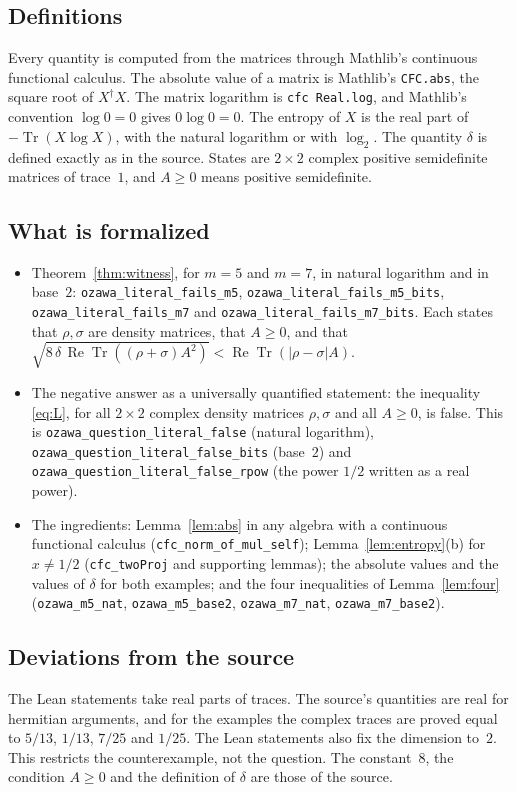 \documentclass[11pt]{amsart}
\theoremstyle{definition}\newtheorem{definition}[theorem]{Definition}
\theoremstyle{remark}\newtheorem{remark}[theorem]{Remark}
\DeclareMathOperator{\Tr}{Tr}
\DeclareMathOperator{\re}{Re}
\newcommand{\abs}[1]{\lvert #1\rvert}
\begin{document}
\subsection{Definitions}
Every quantity is computed from the matrices through Mathlib's continuous functional calculus. The absolute value of a matrix is Mathlib's \texttt{CFC.abs}, the square root of \(X^\dagger X\). The matrix logarithm is \texttt{cfc Real.log}, and Mathlib's convention \(\log0=0\) gives \(0\log0=0\). The entropy of \(X\) is the real part of \(-\Tr(X\log X)\), with the natural logarithm or with \(\log_2\). The quantity \(\delta\) is defined exactly as in the source. States are \(2\times2\) complex positive semidefinite matrices of trace~\(1\), and \(A\ge0\) means positive semidefinite.

\subsection{What is formalized}
\begin{itemize}
\item Theorem~\ref{thm:witness}, for \(m=5\) and \(m=7\), in natural logarithm and in base~\(2\): \texttt{ozawa\_literal\_fails\_m5}, \texttt{ozawa\_literal\_fails\_m5\_bits}, \texttt{ozawa\_literal\_fails\_m7} and \texttt{ozawa\_literal\_fails\_m7\_bits}. Each states that \(\rho,\sigma\) are density matrices, that \(A\ge0\), and that \(\sqrt{8\,\delta\,\re\Tr((\rho+\sigma)A^2)}<\re\Tr(\abs{\rho-\sigma}A)\).
\item The negative answer as a universally quantified statement: the inequality \eqref{eq:L}, for all \(2\times2\) complex density matrices \(\rho,\sigma\) and all \(A\ge0\), is false. This is \texttt{ozawa\_question\_literal\_false} (natural logarithm), \texttt{ozawa\_question\_literal\_false\_bits} (base~\(2\)) and \texttt{ozawa\_question\_literal\_false\_rpow} (the power \(1/2\) written as a real power).
\item The ingredients: Lemma~\ref{lem:abs} in any algebra with a continuous functional calculus (\texttt{cfc\_norm\_of\_mul\_self}); Lemma~\ref{lem:entropy}(b) for \(x\ne1/2\) (\texttt{cfc\_twoProj} and supporting lemmas); the absolute values and the values of \(\delta\) for both examples; and the four inequalities of Lemma~\ref{lem:four} (\texttt{ozawa\_m5\_nat}, \texttt{ozawa\_m5\_base2}, \texttt{ozawa\_m7\_nat}, \texttt{ozawa\_m7\_base2}).
\end{itemize}

\subsection{Deviations from the source}
The Lean statements take real parts of traces. The source's quantities are real for hermitian arguments, and for the examples the complex traces are proved equal to \(5/13\), \(1/13\), \(7/25\) and \(1/25\). The Lean statements also fix the dimension to~\(2\). This restricts the counterexample, not the question. The constant~\(8\), the condition \(A\ge0\) and the definition of \(\delta\) are those of the source.
\end{document}
